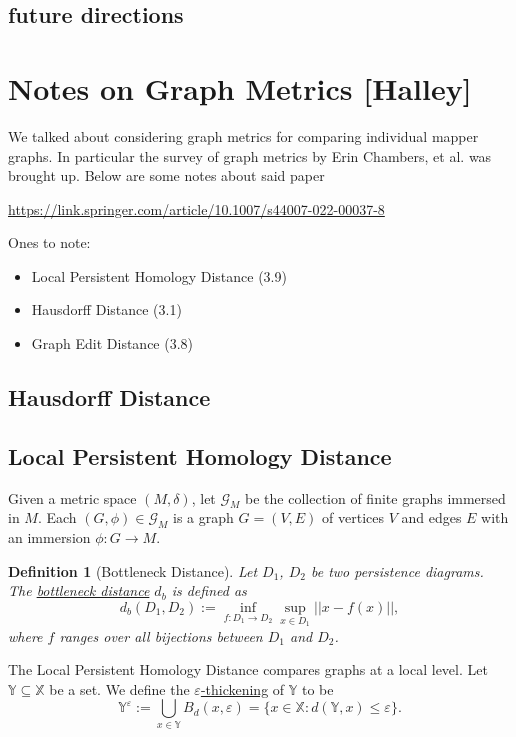 \documentclass{article}
\newtheorem{definition}{Definition}[section]
\begin{document}
\subsection{future directions}

\section{Notes on Graph Metrics [Halley]}\label{sec:graph-metrics}
We talked about considering graph metrics for comparing individual mapper graphs. In particular the survey of graph metrics by Erin Chambers, et al. \cite{Buchin2023-graph-metrics} was brought up.
Below are some notes about said paper 

\url{https://link.springer.com/article/10.1007/s44007-022-00037-8}

Ones to note:
\begin{itemize}
    \item Local Persistent Homology Distance (3.9)
    \item Hausdorff Distance (3.1)
    \item Graph Edit Distance (3.8)
\end{itemize}

\subsection{Hausdorff Distance}
\subsection{Local Persistent Homology Distance}

Given a metric space $(M,\delta)$, let $\mathcal{G}_M$ be the collection of finite graphs immersed in $M$. Each $(G,\phi)\in\mathcal{G}_M$ is a graph $G=(V,E)$ of vertices $V$ and edges $E$ with an immersion $\phi\colon G\to M$.

\begin{definition}[Bottleneck Distance]
    Let $D_1$, $D_2$ be two persistence diagrams. The \underline{bottleneck distance} $d_b$ is defined as 
    $$ d_b(D_1,D_2) := \inf_{f\colon D_1\to D_2}\sup_{x\in D_1} ||x-f(x)||,$$
    where $f$ ranges over all bijections between $D_1$ and $D_2$.   
\end{definition}
The Local Persistent Homology Distance compares graphs at a local level. Let $\mathbb{Y}\subseteq \mathbb{X}$ be a set. We define the \underline{$\varepsilon$-thickening} of $\mathbb{Y}$ to be
    $$ \mathbb{Y}^\varepsilon := \bigcup_{x\in\mathbb{Y}}B_d(x,\varepsilon) = \{x\in \mathbb{X}\colon d(\mathbb{Y},x)\leq\varepsilon\}.$$
\end{document}
